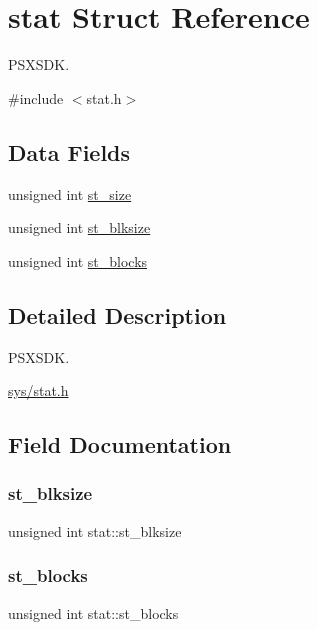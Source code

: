\hypertarget{structstat}{}\section{stat Struct Reference}
\label{structstat}


P\+S\+X\+S\+DK.  




{\ttfamily \#include $<$stat.\+h$>$}

\subsection*{Data Fields}
\begin{DoxyCompactItemize}
\item 
unsigned int \hyperlink{structstat_af4a3c7f1e38a875f5e01700937482132}{st\+\_\+size}
\item 
unsigned int \hyperlink{structstat_ad67a66fb3cc1650b60499ce5a079b494}{st\+\_\+blksize}
\item 
unsigned int \hyperlink{structstat_a602c92ca5c5fff2d3aae7d0ba60e05c7}{st\+\_\+blocks}
\end{DoxyCompactItemize}


\subsection{Detailed Description}
P\+S\+X\+S\+DK. 

\hyperlink{stat_8h}{sys/stat.\+h} 

\subsection{Field Documentation}
\mbox{\label{structstat_ad67a66fb3cc1650b60499ce5a079b494}} 
\subsubsection{\texorpdfstring{st\+\_\+blksize}{st\_blksize}}
{\footnotesize\ttfamily unsigned int stat\+::st\+\_\+blksize}

\mbox{\label{structstat_a602c92ca5c5fff2d3aae7d0ba60e05c7}} 
\subsubsection{\texorpdfstring{st\+\_\+blocks}{st\_blocks}}
{\footnotesize\ttfamily unsigned int stat\+::st\+\_\+blocks}

